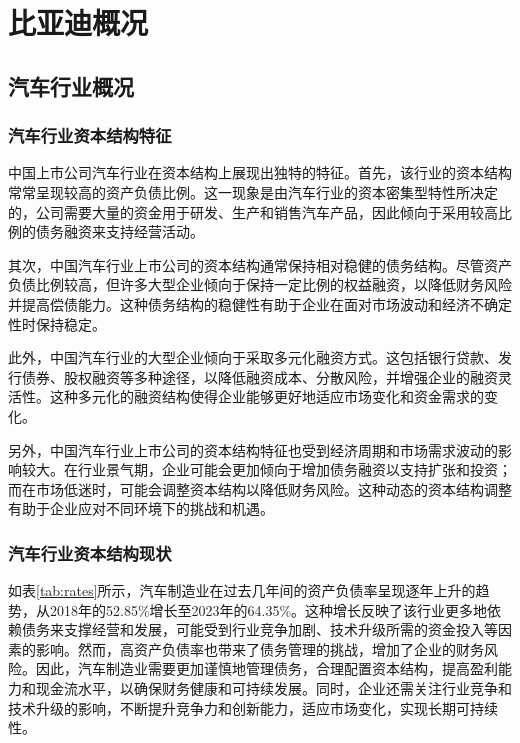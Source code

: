 \chapter{比亚迪概况}
\section{汽车行业概况}
\subsection{汽车行业资本结构特征}
中国上市公司汽车行业在资本结构上展现出独特的特征。首先，该行业的资本结构常常呈现较高的资产负债比例。这一现象是由汽车行业的资本密集型特性所决定的，公司需要大量的资金用于研发、生产和销售汽车产品，因此倾向于采用较高比例的债务融资来支持经营活动。

其次，中国汽车行业上市公司的资本结构通常保持相对稳健的债务结构。尽管资产负债比例较高，但许多大型企业倾向于保持一定比例的权益融资，以降低财务风险并提高偿债能力。这种债务结构的稳健性有助于企业在面对市场波动和经济不确定性时保持稳定。

此外，中国汽车行业的大型企业倾向于采取多元化融资方式。这包括银行贷款、发行债券、股权融资等多种途径，以降低融资成本、分散风险，并增强企业的融资灵活性。这种多元化的融资结构使得企业能够更好地适应市场变化和资金需求的变化。

另外，中国汽车行业上市公司的资本结构特征也受到经济周期和市场需求波动的影响较大。在行业景气期，企业可能会更加倾向于增加债务融资以支持扩张和投资；而在市场低迷时，可能会调整资本结构以降低财务风险。这种动态的资本结构调整有助于企业应对不同环境下的挑战和机遇。
\subsection{汽车行业资本结构现状}
如表\eqref{tab:rates}所示，汽车制造业在过去几年间的资产负债率呈现逐年上升的趋势，从2018年的52.85\%增长至2023年的64.35\%。这种增长反映了该行业更多地依赖债务来支撑经营和发展，可能受到行业竞争加剧、技术升级所需的资金投入等因素的影响。然而，高资产负债率也带来了债务管理的挑战，增加了企业的财务风险。因此，汽车制造业需要更加谨慎地管理债务，合理配置资本结构，提高盈利能力和现金流水平，以确保财务健康和可持续发展。同时，企业还需关注行业竞争和技术升级的影响，不断提升竞争力和创新能力，适应市场变化，实现长期可持续性。

